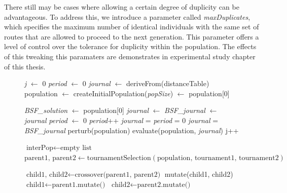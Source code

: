 \documentclass[twoside]{ctuthesis}
\theoremstyle{plain}
\theoremstyle{definition}
\theoremstyle{note}
\begin{document}
There still may be cases where allowing a certain degree of duplicity can be advantageous. To address this, we introduce a parameter called \emph{maxDuplicates}, which specifies the maximum number of identical individuals with the same set of routes that are allowed to proceed to the next generation. This parameter offers a level of control over the tolerance for duplicity within the population. The effects of this tweaking this paramaters are demonstrates in experimental study chapter of this thesis.

\begin{figure}
	\begin{algorithmic}[1]
		\small
		\State \emph{j} $\gets$ 0
		\State \emph{period} $\gets$ 0
		\State \emph{journal} $\gets$ deriveFrom(distanceTable)
		\State population $\gets$ createInitialPopulation(\emph{popSize})
		\State \emph{} $\gets$ population[0]
		
		
		\State \emph{BSF\_solution} $\gets$ population[0]
		\State \emph{journal} $\gets$ 
		\State \emph{BSF\_journal} $\gets$ \emph{journal}
		\State \emph{period} $\gets$ 0
		\State \emph{period}++	
		\State \emph{journal} = 
		\Else
		\State \emph{period} = 0
		\State \emph{journal} = \emph{BSF\_journal}
		\EndIf
		\State perturb(population)
		\State evaluate(population, \emph{journal})
		\EndIf
		\State j++
		
		
		\State $\text{interPop} \gets \text{empty list}$
		\State $\text{parent1, parent2} \gets \text{tournamentSelection}(\text{population, tournament1, tournament2})$
		
		\State $\text{child1, child2} \gets \text{crossover(parent1, parent2)}$
		\State mutate(child1, child2)
		\EndIf
		\Else
		\State $\text{child1} \gets \text{parent1.mutate()}$
		\State $\text{child2} \gets \text{parent2.mutate()}$
		\EndIf
		

\end{algorithmic}
\end{figure}
\end{document}

